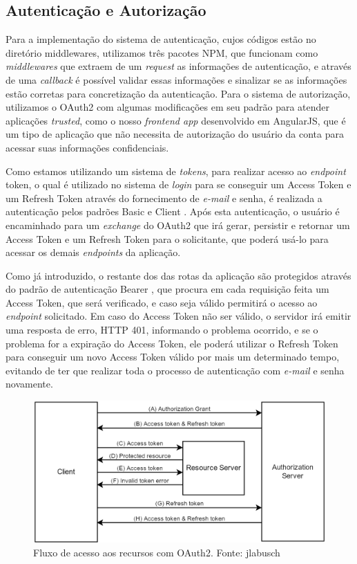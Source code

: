 \subsection{Autenticação e Autorização}
Para a implementação do sistema de autenticação, cujos códigos estão no diretório middlewares, utilizamos três pacotes NPM, que funcionam como \textit{middlewares} que extraem de um \textit{request} as informações de autenticação, e através de uma \textit{callback} é possível validar essas informações e sinalizar se as informações estão corretas para concretização da autenticação. Para o sistema de autorização, utilizamos o OAuth2 com algumas modificações em seu padrão para atender aplicações \textit{trusted}, como o nosso \textit{frontend app} desenvolvido em AngularJS, que é um tipo de aplicação que não necessita de autorização do usuário da conta para acessar suas informações confidenciais.

Como estamos utilizando um sistema de \textit{tokens}, para realizar acesso ao \textit{endpoint} token, o qual é utilizado no sistema de \textit{login} para se conseguir um Access Token e um Refresh Token através do fornecimento de \textit{e-mail} e senha, é realizada a autenticação pelos padrões Basic \cite{passport-basic} e Client \cite{passport-client}. Após esta autenticação, o usuário é encaminhado para um \textit{exchange} do OAuth2 que irá gerar, persistir e retornar um Access Token e um Refresh Token para o solicitante, que poderá usá-lo para acessar os demais \textit{endpoints} da aplicação.

Como já introduzido, o restante dos das rotas da aplicação são protegidos através do padrão de autenticação Bearer \cite{passport-bearer}, que procura em cada requisição feita um Access Token, que será verificado, e caso seja válido permitirá o acesso ao \textit{endpoint} solicitado. Em caso do Access Token não ser válido, o servidor irá emitir uma resposta de erro, HTTP 401, informando o problema ocorrido, e se o problema for a expiração do Access Token, ele poderá utilizar o Refresh Token para conseguir um novo Access Token válido por mais um determinado tempo, evitando de ter que realizar toda o processo de autenticação com \textit{e-mail} e senha novamente.

\begin{figure}[!htb]
	\centering
	\includegraphics[scale=0.49]{imagens/oauth2.png}
	\caption{\small Fluxo de acesso aos recursos com OAuth2. Fonte: jlabusch \cite{img-jlabusch}}
	\label{fig:oauth2}
\end{figure}

